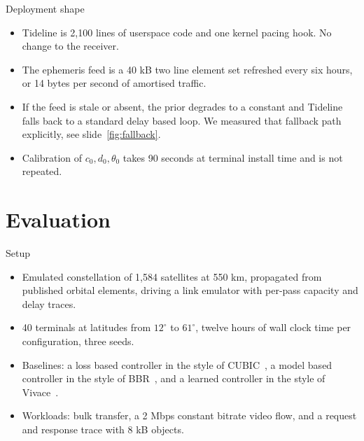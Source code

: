 \documentclass[aspectratio=169,10pt]{beamer}
\newcommand{\sysname}{Tideline}
\begin{document}
\begin{frame}{Deployment shape}
  \begin{itemize}
    \item<1-> \sysname{} is 2{,}100 lines of userspace code and one kernel pacing hook. No change to the receiver.
    \item<2-> The ephemeris feed is a 40 kB two line element set refreshed every six hours, or 14 bytes
      per second of amortised traffic.
    \item<3-> If the feed is stale or absent, the prior degrades to a constant and \sysname{} falls back to
      a standard delay based loop. We measured that fallback path explicitly, see slide~\ref{fig:fallback}.
    \item<4-> Calibration of $c_0, d_0, \theta_0$ takes 90 seconds at terminal install time and is not
      repeated.
  \end{itemize}
\end{frame}

\section{Evaluation}

\begin{frame}{Setup}
  \begin{itemize}
    \item Emulated constellation of 1{,}584 satellites at 550 km, propagated from published orbital
      elements, driving a link emulator with per-pass capacity and delay traces.
    \item 40 terminals at latitudes from $12^{\circ}$ to $61^{\circ}$, twelve hours of wall clock time
      per configuration, three seeds.
    \item Baselines: a loss based controller in the style of CUBIC~\cite{ha2008cubic}, a model based
      controller in the style of BBR~\cite{cardwell2016bbr}, and a learned controller in the style of
      Vivace~\cite{dong2018vivace}.
    \item Workloads: bulk transfer, a 2 Mbps constant bitrate video flow, and a request and response
      trace with 8 kB objects.
  \end{itemize}
\end{frame}
\end{document}
